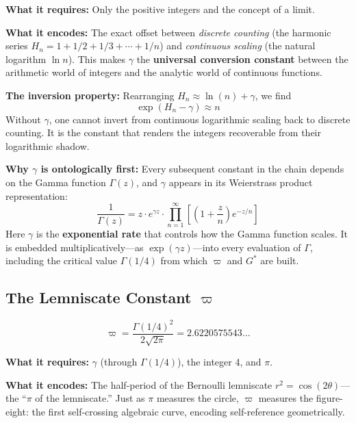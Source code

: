 \documentclass[11pt, letterpaper]{article}
\newcommand{\G}{G^*}
\theoremstyle{definition}
\theoremstyle{remark}
\begin{document}
\noindent\textbf{What it requires:} Only the positive integers and the concept of a limit.

\noindent\textbf{What it encodes:} The exact offset between \textit{discrete counting} (the harmonic series $H_n = 1 + 1/2 + 1/3 + \cdots + 1/n$) and \textit{continuous scaling} (the natural logarithm $\ln n$). This makes $\gamma$ the \textbf{universal conversion constant} between the arithmetic world of integers and the analytic world of continuous functions.

\noindent\textbf{The inversion property:} Rearranging $H_n \approx \ln(n) + \gamma$, we find
\begin{equation}
    \exp(H_n - \gamma) \approx n
\end{equation}
Without $\gamma$, one cannot invert from continuous logarithmic scaling back to discrete counting. It is the constant that renders the integers recoverable from their logarithmic shadow.

\noindent\textbf{Why $\gamma$ is ontologically first:} Every subsequent constant in the chain depends on the Gamma function $\Gamma(z)$, and $\gamma$ appears in its Weierstrass product representation:
\begin{equation}
    \frac{1}{\Gamma(z)} = z \cdot e^{\gamma z} \cdot \prod_{n=1}^{\infty}\left[\left(1 + \frac{z}{n}\right) e^{-z/n}\right]
\end{equation}
Here $\gamma$ is the \textbf{exponential rate} that controls how the Gamma function scales. It is embedded multiplicatively---as $\exp(\gamma z)$---into every evaluation of $\Gamma$, including the critical value $\Gamma(1/4)$ from which $\varpi$ and $\G$ are built.

\subsection{The Lemniscate Constant $\varpi$}

\begin{equation}
    \varpi = \frac{\Gamma(1/4)^2}{2\sqrt{2\pi}} = 2.6220575543\dots
\end{equation}

\noindent\textbf{What it requires:} $\gamma$ (through $\Gamma(1/4)$), the integer 4, and $\pi$.

\noindent\textbf{What it encodes:} The half-period of the Bernoulli lemniscate $r^2 = \cos(2\theta)$---the ``$\pi$ of the lemniscate.'' Just as $\pi$ measures the circle, $\varpi$ measures the figure-eight: the first self-crossing algebraic curve, encoding self-reference geometrically.
\end{document}
